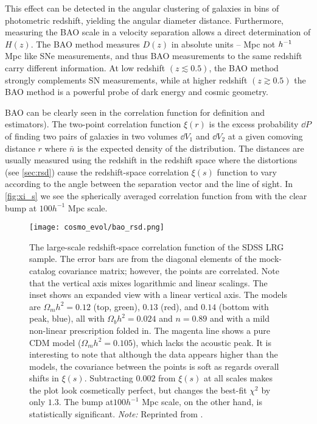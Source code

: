 This effect can be detected in the angular clustering of galaxies in bins of photometric redshift, yielding the angular diameter distance. Furthermore, measuring the BAO scale in a velocity separation allows a direct determination of $H(z)$. The BAO method measures $D(z)$ in absolute units -- Mpc not $h^{-1}$ Mpc like SNe measurements, and thus BAO measurements to the same redshift carry different information. At low redshift $(z\lesssim0.5)$, the BAO method strongly complements SN measurements, while at higher redshift $(z\gtrsim0.5)$ the BAO method is a powerful probe of dark energy and cosmic geometry.

BAO can be clearly seen in the correlation function \parencite[see e.g.][]{1993ApJ...412...64L} for definition and estimators). The two-point correlation function $\xi(r)$ is the excess probability $\dd P$ of finding two pairs of galaxies in two volumes $\dd V_1$ and $\dd V_2$ at a given comoving distance $r$
where $\bar{n}$ is the expected density of the distribution. The distances are usually measured using the redshift in the redshift space where the distortions (see \autoref{sec:rsd}) cause the redshift-space correlation $\xi(s)$ function to vary according to the angle between the separation vector and the line of sight. In \autoref{fig:xi_s} we see the spherically averaged correlation function from \textcite{2005ApJ...633..560E} with the clear bump at $100h^{-1}$ Mpc scale.
\begin{figure}[!hbt]
    \centering
    \texttt{[image: cosmo\_evol/bao\_rsd.png]}
    \caption{The large-scale redshift-space correlation function of the SDSS LRG sample. The error bars are from the diagonal elements of the mock-catalog covariance matrix; however, the points are correlated. Note that the vertical axis mixes logarithmic and linear scalings. The inset shows an expanded view with a linear vertical axis. The models are $\Omega_mh^2=0.12$ (top, green), $0.13$ (red), and $0.14$ (bottom with peak, blue), all with $\Omega_bh^2=0.024$ and $n=0.89$ and with a mild non-linear prescription folded in. The magenta line shows a pure CDM model ($\Omega_mh^2=0.105$), which lacks the acoustic peak. It is interesting to note that although the data appears higher than the models, the covariance between the points is soft as regards overall shifts in $\xi(s)$. Subtracting $0.002$ from $\xi(s)$ at all scales makes the plot look cosmetically perfect, but changes the best-fit $\chi^2$ by only $1.3$. The bump at$100h^{-1}$ Mpc scale, on the other hand, is statistically significant. \textit{Note:} Reprinted from \textcite{2005ApJ...633..560E}.}
    \label{fig:xi_s}
\end{figure}

